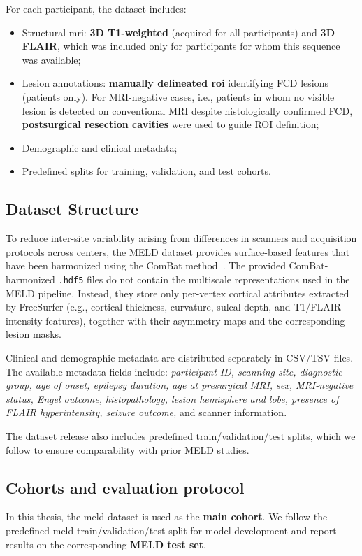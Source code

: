 \documentclass[FCD_GNN.tex]{subfiles}
\begin{document}
For each participant, the dataset includes:
\begin{itemize}
    \item Structural \ac{mri}: \textbf{3D T1-weighted} (acquired for all participants) and \textbf{3D FLAIR}, which was included only 
    for participants for whom this sequence was available;
    \item Lesion annotations: \textbf{manually delineated \ac{roi}} identifying FCD lesions (patients only).
    For MRI-negative cases, i.e., patients in whom no visible lesion is detected on conventional MRI despite histologically confirmed FCD, \textbf{postsurgical resection cavities} were used to guide ROI definition;

    \item Demographic and clinical metadata;
    \item Predefined splits for training, validation, and test cohorts.
\end{itemize}

\subsection*{Dataset Structure}
To reduce inter-site variability arising from differences in scanners and acquisition protocols across centers, 
the MELD dataset provides surface-based features that have been harmonized using the ComBat method~\cite{fortin2018combat}.
The provided ComBat-harmonized \texttt{.hdf5} files do not contain the multiscale
representations used in the MELD pipeline. Instead, they store only per-vertex
cortical attributes extracted by FreeSurfer (e.g., cortical thickness,
curvature, sulcal depth, and T1/FLAIR intensity features), together with their
asymmetry maps and the corresponding lesion masks.

Clinical and demographic metadata are distributed separately in CSV/TSV files. 
The available metadata fields include: \textit{participant ID, scanning site, diagnostic group, age of onset,
epilepsy duration, age at presurgical MRI, sex, MRI-negative status, Engel
outcome, histopathology, lesion hemisphere and lobe, presence of FLAIR
hyperintensity, seizure outcome,} and scanner information.

The dataset release also includes predefined train/validation/test splits, which
we follow to ensure comparability with prior MELD studies.

\subsection*{Cohorts and evaluation protocol}
In this thesis, the \ac{meld} dataset is used as the \textbf{main cohort}.
We follow the predefined \ac{meld} train/validation/test split for model development and report results on the corresponding \textbf{MELD test set}.
\end{document}
